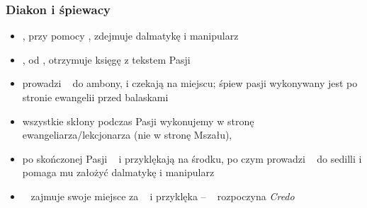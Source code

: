 \subsubsection*{\textbf{Diakon i śpiewacy}}
\begin{itemize}
      \item \dd, przy pomocy , zdejmuje dalmatykę i manipularz
      \item \dd, od , otrzymuje księgę z tekstem Pasji
      \item {} prowadzi \dd~ do ambony,  i  czekają na
            miejscu; śpiew pasji wykonywany jest po stronie ewangelii przed
            balaskami
      \item wszystkie skłony podczas Pasji wykonujemy w stronę
            ewangeliarza/lekcjonarza (nie w stronę Mszału),
      \item po skończonej Pasji \dd~ i  przyklękają na środku, po czym 
            prowadzi \dd~ do sedilli i pomaga mu założyć dalmatykę i manipularz
      \item \dd~ zajmuje swoje miejsce za \ii~ i przyklęka --
            \ii~ rozpoczyna \textit{Credo}
\end{itemize}